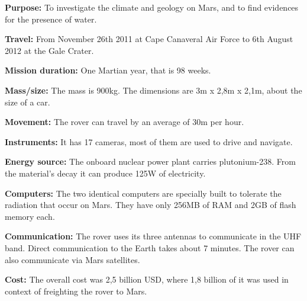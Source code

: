 \begin{tcolorbox}[colback=red!5,colframe=DarkRed!40!black,title=Curiosity: 10 facts about the rover]

\textbf{Purpose:} To investigate the climate and geology on Mars, and to find evidences for the presence of water.

\textbf{Travel:} From November 26th 2011 at Cape Canaveral Air Force to 6th August 2012 at the Gale Crater.

\textbf{Mission duration:} One Martian year, that is 98 weeks.

\textbf{Mass/size:} The mass is 900kg. The dimensions are 3m x 2,8m x 2,1m, about the size of a car.

\textbf{Movement:} The rover can travel by an average of 30m per hour.

\textbf{Instruments:} It has 17 cameras, most of them are used to drive and navigate.

\textbf{Energy source:} The onboard nuclear power plant carries plutonium-238. From the material's decay it can produce 125W of electricity.

\textbf{Computers:} The two identical computers are specially built to tolerate the radiation that occur on Mars. They have only 256MB of RAM and 2GB of flash memory each.

\textbf{Communication:} The rover uses its three antennas to communicate in the UHF band. Direct communication to the Earth takes about 7 minutes. The rover can also communicate via Mars satellites.

\textbf{Cost:} The overall cost was 2,5 billion USD, where 1,8 billion of it was used in context of freighting the rover to Mars.

\end{tcolorbox}